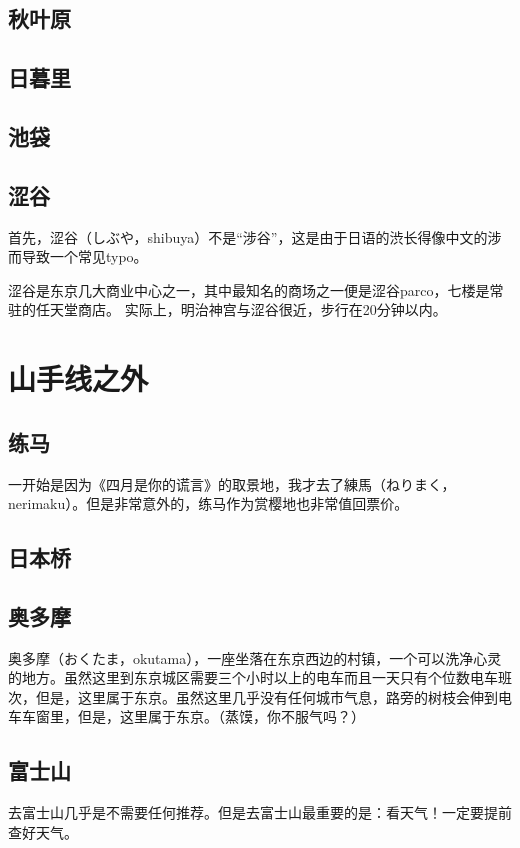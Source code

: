 \documentclass{article}
\begin{document}
\subsection{秋叶原}

\subsection{日暮里}

\subsection{池袋}

\subsection{涩谷}
首先，涩谷（しぶや，shibuya）不是“涉谷”，这是由于日语的渋长得像中文的涉而导致一个常见typo。\par
涩谷是东京几大商业中心之一，其中最知名的商场之一便是涩谷parco，七楼是常驻的任天堂商店。
实际上，明治神宫与涩谷很近，步行在20分钟以内。

\section{山手线之外}

\subsection{练马}
一开始是因为《四月是你的谎言》的取景地，我才去了練馬（ねりまく，nerimaku）。但是非常意外的，练马作为赏樱地也非常值回票价。

\subsection{日本桥}

\subsection{奥多摩}
奥多摩（おくたま，okutama），一座坐落在东京西边的村镇，一个可以洗净心灵的地方。虽然这里到东京城区需要三个小时以上的电车而且一天只有个位数电车班次，但是，这里属于东京。虽然这里几乎没有任何城市气息，路旁的树枝会伸到电车车窗里，但是，这里属于东京。（蒸馍，你不服气吗？）

\subsection{富士山}
去富士山几乎是不需要任何推荐。但是去富士山最重要的是：看天气！一定要提前查好天气。
\end{document}
